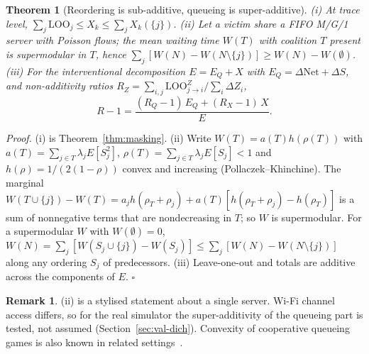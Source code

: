 \documentclass[11pt]{article}
\newtheorem{theorem}{Theorem}
\theoremstyle{definition}
\newtheorem{remark}{Remark}
\newcommand{\Net}{\mathrm{Net}}
\begin{document}
\begin{theorem}[Reordering is sub-additive, queueing is super-additive]\label{thm:dichotomy}
(i) At trace level, $\sum_j\mathrm{LOO}_j\le X_k\le\sum_jX_k(\{j\})$. (ii) Let a victim share a FIFO M/G/1 server with Poisson flows; the mean waiting time $W(T)$ with coalition $T$ present is supermodular in $T$, hence $\sum_j[W(N)-W(N\setminus\{j\})]\ge W(N)-W(\emptyset)$. (iii) For the interventional decomposition $E=E_Q+X$ with $E_Q=\Delta\Net+\Delta S$, and non-additivity ratios $R_Z=\sum_{i,j}\mathrm{LOO}^Z_{j\to i}/\sum_i\Delta Z_i$,
\[
R-1=\frac{(R_Q-1)\,E_Q+(R_X-1)\,X}{E}.
\]
\end{theorem}
\emph{Proof.} (i) is Theorem~\ref{thm:masking}. (ii) Write $W(T)=a(T)h(\rho(T))$ with $a(T)=\sum_{j\in T}\lambda_jE[S_j^2]$, $\rho(T)=\sum_{j\in T}\lambda_jE[S_j]<1$ and $h(\rho)=1/(2(1-\rho))$ convex and increasing (Pollaczek--Khinchine). The marginal $W(T\cup\{j\})-W(T)=a_jh(\rho_T+\rho_j)+a(T)[h(\rho_T+\rho_j)-h(\rho_T)]$ is a sum of nonnegative terms that are nondecreasing in $T$; so $W$ is supermodular. For a supermodular $W$ with $W(\emptyset)=0$, $W(N)=\sum_j[W(S_j\cup\{j\})-W(S_j)]\le\sum_j[W(N)-W(N\setminus\{j\})]$ along any ordering $S_j$ of predecessors. (iii) Leave-one-out and totals are additive across the components of $E$. \hfill$\square$
\begin{remark}
(ii) is a stylised statement about a single server. Wi-Fi channel access differs, so for the real simulator the super-additivity of the queueing part is tested, not assumed (Section~\ref{sec:val-dich}). Convexity of cooperative queueing games is also known in related settings~\cite{mitra2023shared}.
\end{remark}
\end{document}
